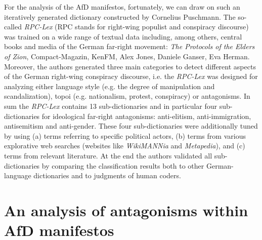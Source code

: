 \documentclass[a4paper]{scrreprt}
\begin{document}
For the analysis of the AfD manifestos, fortunately, we can draw on such an iteratively generated dictionary constructed by Cornelius Puschmann. \citep{puschmann:2022} The so-called {\em RPC-Lex} (RPC stands for right-wing populist and conspiracy discourse) was trained on a wide range of textual data including, among others, central books and media of the German far-right movement: {\em The Protocols of the Elders of Zion}, Compact-Magazin, KenFM, Alex Jones, Daniele Ganser, Eva Herman. \cite[p.~1153]{puschmann:2022} Moreover, the authors generated three main categories to detect different aspects of the German right-wing conspiracy discourse, i.e. the {\em RPC-Lex} was designed for analyzing either language style (e.g. the degree of manipulation and scandalization), topoi (e.g. nationalism, protest, conspiracy) or antagonisms. In sum the {\em RPC-Lex} contains 13 sub-dictionaries and in particular four sub-dictionaries for ideological far-right antagonisms: anti-elitism, anti-immigration, antisemitism and anti-gender. These four sub-dictionaries were additionally tuned by using (a) terms referring to specific political actors, (b) terms from various explorative web searches (websites like {\em WikiMANNia} and {\em Metapedia}), and (c) terms from relevant literature. \cite[p.~1154/55]{puschmann:2022} At the end the authors validated all sub-dictionaries by comparing the classification results both to other German-language dictionaries and to judgments of human coders.
\chapter{An analysis of antagonisms within AfD manifestos}
\end{document}
